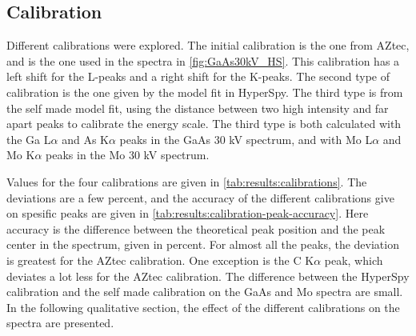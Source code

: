 


\subsection{Calibration}
\label{sec:results:qualitative:calibration}

Different calibrations were explored.
The initial calibration is the one from AZtec, and is the one used in the spectra in \cref{fig:GaAs30kV_HS}.
This calibration has a left shift for the L-peaks and a right shift for the K-peaks.
The second type of calibration is the one given by the model fit in HyperSpy.
The third type is from the self made model fit, using the distance between two high intensity and far apart peaks to calibrate the energy scale.
The third type is both calculated with the Ga L$\alpha$ and As K$\alpha$ peaks in the GaAs 30 kV spectrum, and with Mo L$\alpha$ and Mo K$\alpha$ peaks in the Mo 30 kV spectrum.

Values for the four calibrations are given in \cref{tab:results:calibrations}.
The deviations are a few percent, and the accuracy of the different calibrations give on spesific peaks are given in \cref{tab:results:calibration-peak-accuracy}.
Here accuracy is the difference between the theoretical peak position and the peak center in the spectrum, given in percent.
For almost all the peaks, the deviation is greatest for the AZtec calibration.
One exception is the C K$\alpha$ peak, which deviates a lot less for the AZtec calibration. %
The difference between the HyperSpy calibration and the self made calibration on the GaAs and Mo spectra are small.
In the following qualitative section, the effect of the different calibrations on the spectra are presented.













